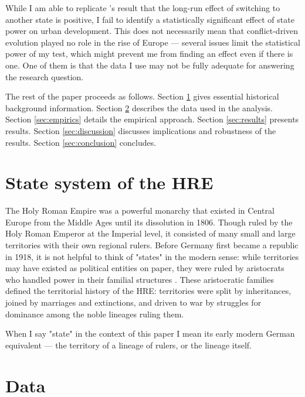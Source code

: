 \documentclass[11pt, a4paper]{article}
\begin{document}
While I am able to replicate \cite{schoenholzer2022}'s result that the long-run effect of switching to another state is positive, I fail to identify a statistically significant effect of state power on urban development. This does not necessarily mean that conflict-driven evolution played no role in the rise of Europe --- several issues limit the statistical power of my test, which might prevent me from finding an effect even if there is one. One of them is that the data I use may not be fully adequate for answering the research question.

The rest of the paper proceeds as follows. Section \ref{sec:background} gives essential historical background information. Section \ref{sec:data} describes the data used in the analysis. Section \ref{sec:empirics} details the empirical approach. Section \ref{sec:results} presents results. Section \ref{sec:discussion} discusses implications and robustness of the results. Section \ref{sec:conclusion} concludes.



\section{State system of the HRE} \label{sec:background}

The Holy Roman Empire was a powerful monarchy that existed in Central Europe from the Middle Ages until its dissolution in 1806. Though ruled by the Holy Roman Emperor at the Imperial level, it consisted of many small and large territories with their own regional rulers. Before Germany first became a republic in 1918, it is not helpful to think of "states" in the modern sense: while territories may have existed as political entities on paper, they were ruled by aristocrats who handled power in their familial structures \citep[pp. 2-3]{pt2}. These aristocratic families defined the territorial history of the HRE: territories were split by inheritances, joined by marriages and extinctions, and driven to war by struggles for dominance among the noble lineages ruling them. 

When I say "state" in the context of this paper I mean its early modern German equivalent --- the territory of a lineage of rulers, or the lineage itself.


\section{Data} \label{sec:data}
\end{document}
